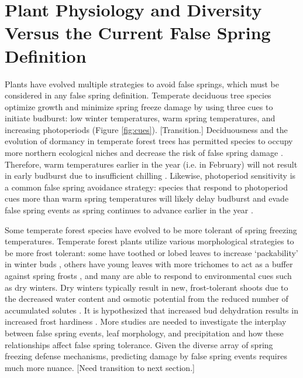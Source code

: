 \documentclass{article}\usepackage[]{graphicx}\usepackage[]{color}
\begin{document}
\section {Plant Physiology and Diversity Versus the Current False Spring Definition}
Plants have evolved multiple strategies to avoid false springs, which must be considered in any false spring definition. Temperate deciduous tree species optimize growth and minimize spring freeze damage by using three cues to initiate budburst: low winter temperatures, warm spring temperatures, and increasing photoperiods \citep{Cleland2007, Polgar2011} (Figure \ref{fig:cues}). [Transition.] Deciduousness and the evolution of dormancy in temperate forest trees has permitted species to occupy more northern ecological niches and decrease the risk of false spring damage \citep{Samish1954}. Therefore, warm temperatures earlier in the year (i.e. in February) will not result in early budburst due to insufficient chilling \citep{Basler2012}. Likewise, photoperiod sensitivity is a common false spring avoidance strategy: species that respond to photoperiod cues more than warm spring temperatures will likely delay budburst and evade false spring events as spring continues to advance earlier in the year \citep{Basler2014}. 

Some temperate forest species have evolved to be more tolerant of spring freezing temperatures. Temperate forest plants utilize various morphological strategies to be more frost tolerant: some have toothed or lobed leaves to increase `packability' in winter buds \citep{Edwards2017}, others have young leaves with more trichomes to act as a buffer against spring frosts \citep{Agrawal2004}, and many are able to respond to environmental cues such as dry winters. Dry winters typically result in new, frost-tolerant shoots due to the decreased water content and osmotic potential from the reduced number of accumulated solutes \citep{Morin2007, Hofmann2015}. It is hypothesized that increased bud dehydration results in increased frost hardiness \citep{Beck2007, Nielsen2009, Poirier2010, Kathke2011, Hofmann2015}. More studies are needed to investigate the interplay between false spring events, leaf morphology, and precipitation and how these relationships affect false spring tolerance. Given the diverse array of spring freezing defense mechanisms, predicting damage by false spring events requires much more nuance. [Need transition to next section.]
\end{document}
